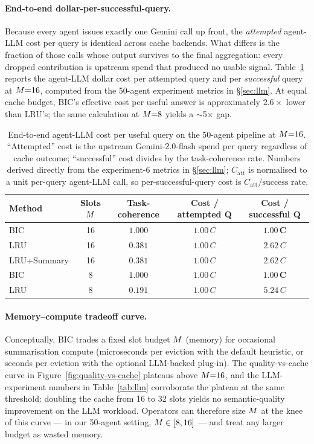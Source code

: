 \paragraph{End-to-end dollar-per-successful-query.}
Because every agent issues exactly one Gemini call up front, the
\emph{attempted} agent-LLM cost per query is identical across cache
backends.  What differs is the fraction of those calls whose output
survives to the final aggregation: every dropped contribution is
upstream spend that produced no usable signal.
Table~\ref{tab:cost} reports the agent-LLM dollar cost per attempted
query and per \emph{successful} query at $M{=}16$, computed from
the 50-agent experiment metrics in \S\ref{sec:llm}.  At equal cache
budget, BIC's effective cost per useful answer is approximately
$2.6\times$ lower than LRU's; the same calculation at $M{=}8$
yields a $\sim$5$\times$ gap.

\begin{table}[t]
\centering
\caption{End-to-end agent-LLM cost per useful query on the 50-agent
  pipeline at $M{=}16$.  ``Attempted'' cost is the upstream
  Gemini-2.0-flash spend per query regardless of cache outcome;
  ``successful'' cost divides by the task-coherence rate.  Numbers
  derived directly from the experiment-6 metrics in \S\ref{sec:llm};
  $C_{\mathrm{att}}$ is normalised to a unit per-query agent-LLM
  call, so per-successful-query cost is $C_{\mathrm{att}} / \text{success rate}$.}
\label{tab:cost}
\vspace{0.3em}
\begin{tabular}{lcccc}
\toprule
\textbf{Method} & \textbf{Slots $M$} & \textbf{Task-coherence} &
\textbf{Cost / attempted Q} & \textbf{Cost / successful Q} \\
\midrule
BIC          & 16 & $1.000$ & $1.00\,C$ & $\mathbf{1.00\,C}$ \\
LRU          & 16 & $0.381$ & $1.00\,C$ & $2.62\,C$ \\
LRU+Summary  & 16 & $0.381$ & $1.00\,C$ & $2.62\,C$ \\
\midrule
BIC          & 8  & $1.000$ & $1.00\,C$ & $\mathbf{1.00\,C}$ \\
LRU          & 8  & $0.191$ & $1.00\,C$ & $5.24\,C$ \\
\bottomrule
\end{tabular}
\end{table}

\paragraph{Memory--compute tradeoff curve.}
Conceptually, BIC trades a fixed slot budget $M$ (memory) for
occasional summarisation compute (microseconds per eviction with the
default heuristic, or seconds per eviction with the optional
LLM-backed plug-in).  The quality-vs-cache curve in
Figure~\ref{fig:quality-vs-cache} plateaus above $M{=}16$, and
the LLM-experiment numbers in Table~\ref{tab:llm} corroborate the
plateau at the same threshold: doubling the cache from 16 to 32 slots
yields no semantic-quality improvement on the LLM workload.  Operators
can therefore size $M$ at the knee of this curve --- in our
50-agent setting, $M \in [8, 16]$ --- and treat any larger budget
as wasted memory.
